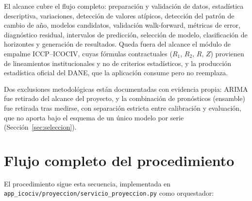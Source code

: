 \documentclass[12pt]{article}
\begin{document}
El alcance cubre el flujo completo: preparaci\'on y validaci\'on de datos, estad\'istica descriptiva, variaciones, detecci\'on de valores at\'ipicos, detecci\'on del patr\'on de cambio de a\~no, modelos candidatos, validaci\'on walk-forward, m\'etricas de error, diagn\'ostico residual, intervalos de predicci\'on, selecci\'on de modelo, clasificaci\'on de horizontes y generaci\'on de resultados. Queda fuera del alcance el m\'odulo de empalme ICCP--ICOCIV, cuyas f\'ormulas contractuales ($R_1$, $R_2$, $R$, $Z$) provienen de lineamientos institucionales y no de criterios estad\'isticos, y la producci\'on estad\'istica oficial del DANE, que la aplicaci\'on consume pero no reemplaza.

Dos exclusiones metodol\'ogicas est\'an documentadas con evidencia propia: ARIMA fue retirado del alcance del proyecto, y la combinaci\'on de pron\'osticos (ensamble) fue retirada tras medirse, con separaci\'on estricta entre calibraci\'on y evaluaci\'on, que no aporta bajo el esquema de un \'unico modelo por serie (Secci\'on~\ref{sec:seleccion}).

\section{Flujo completo del procedimiento}
\label{sec:flujo}

El procedimiento sigue esta secuencia, implementada en \texttt{app\_icociv/proyeccion/servicio\_proyeccion.py} como orquestador:
\end{document}
